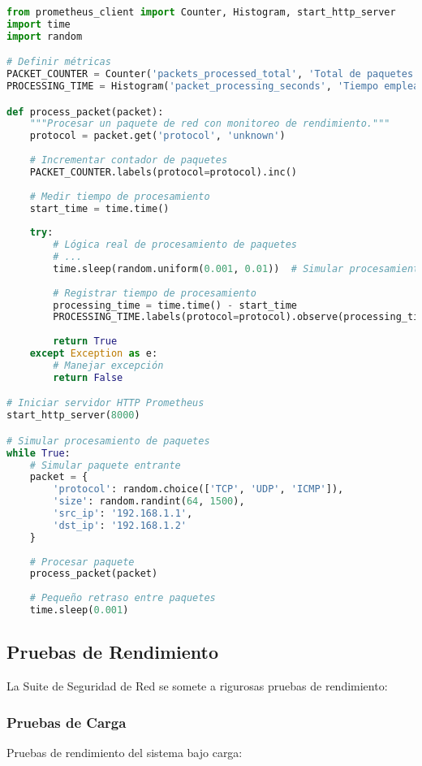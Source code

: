 \begin{lstlisting}[language=python, caption=Ejemplo de Métricas Prometheus]
from prometheus_client import Counter, Histogram, start_http_server
import time
import random

# Definir métricas
PACKET_COUNTER = Counter('packets_processed_total', 'Total de paquetes procesados', ['protocol'])
PROCESSING_TIME = Histogram('packet_processing_seconds', 'Tiempo empleado en procesar paquetes', ['protocol'])

def process_packet(packet):
    """Procesar un paquete de red con monitoreo de rendimiento."""
    protocol = packet.get('protocol', 'unknown')
    
    # Incrementar contador de paquetes
    PACKET_COUNTER.labels(protocol=protocol).inc()
    
    # Medir tiempo de procesamiento
    start_time = time.time()
    
    try:
        # Lógica real de procesamiento de paquetes
        # ...
        time.sleep(random.uniform(0.001, 0.01))  # Simular procesamiento
        
        # Registrar tiempo de procesamiento
        processing_time = time.time() - start_time
        PROCESSING_TIME.labels(protocol=protocol).observe(processing_time)
        
        return True
    except Exception as e:
        # Manejar excepción
        return False

# Iniciar servidor HTTP Prometheus
start_http_server(8000)

# Simular procesamiento de paquetes
while True:
    # Simular paquete entrante
    packet = {
        'protocol': random.choice(['TCP', 'UDP', 'ICMP']),
        'size': random.randint(64, 1500),
        'src_ip': '192.168.1.1',
        'dst_ip': '192.168.1.2'
    }
    
    # Procesar paquete
    process_packet(packet)
    
    # Pequeño retraso entre paquetes
    time.sleep(0.001)
\end{lstlisting}

\subsection{Pruebas de Rendimiento}
La Suite de Seguridad de Red se somete a rigurosas pruebas de rendimiento:

\subsubsection{Pruebas de Carga}
Pruebas de rendimiento del sistema bajo carga:

